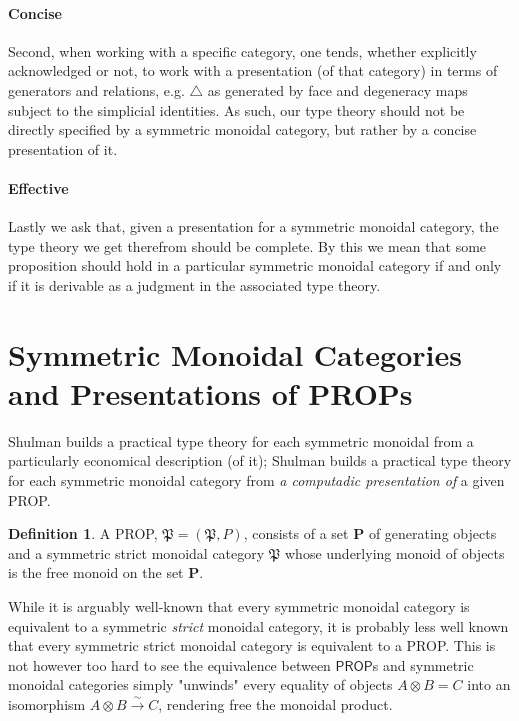 \documentclass[pra,floatfix,
amsmath,superscriptaddress, 12pt]{article}
\theoremstyle{definition}
\newtheorem{definition}{Definition}
\begin{document}
\paragraph{Concise} Second, when working with a specific category, one tends, whether explicitly acknowledged or not, to work with a presentation (of that category) in terms of generators and relations, e.g. $\bigtriangleup$ as generated by face and degeneracy maps subject to the simplicial identities. As such, our type theory should not be directly specified by a symmetric monoidal category, but rather by a concise presentation of it. 

\paragraph{Effective} Lastly we ask that, given a presentation for a symmetric monoidal category, the type theory we get therefrom should be complete. By this we mean that some proposition should hold in a particular symmetric monoidal category if and only if it is derivable as a judgment in the associated type theory.

\section{Symmetric Monoidal Categories and Presentations of \textsf{PROP}s}

Shulman builds a practical type theory for each symmetric monoidal from a particularly economical description (of it); Shulman builds a practical type theory for each symmetric monoidal category from \emph{a computadic presentation of}  a given \textsf{PROP}.



\begin{definition} A \textsf{PROP}, $\mathfrak{P}=(\mathfrak{P},P)$, consists of a set $\mathbf{P}$ of generating objects and a symmetric strict monoidal category $\mathfrak{P}$ whose underlying monoid of objects is the free monoid on the set $\mathbf{P}$.
\end{definition}

While it is arguably well-known that every symmetric monoidal category is equivalent
to a symmetric \emph{strict} monoidal category, it is probably less well known
that every symmetric strict monoidal category is equivalent to
a \textsf{PROP}. This is not however too hard to see the equivalence between $\mathsf{PROP}$s and symmetric monoidal categories simply "unwinds" every equality of objects $A\otimes B = C$ into an isomorphism $A \otimes B \overset{\sim}{\longrightarrow} C$, rendering free the monoidal product.
\end{document}
